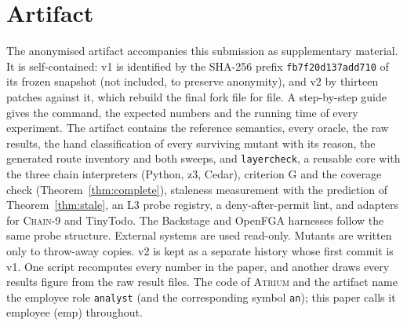 \documentclass[sigconf,review,anonymous]{acmart}
\newcommand{\sysname}{\textsc{Atrium}\xspace}
\newcommand{\sysname}{\textsc{OpenZTAC}\xspace}
\newcommand{\chain}{\textsc{Chain-9}\xspace}
\newcommand{\emp}{\mathrm{emp}}
\begin{document}
\section{Artifact}
\label{app:artifact}
The anonymised artifact accompanies this submission as supplementary material. It is self-contained: v1 is identified by the SHA-256 prefix \texttt{fb7f20d137add710} of its frozen
snapshot (not included, to preserve anonymity), and v2 by thirteen patches against it, which rebuild the final fork
file for file. A step-by-step guide gives the command, the expected numbers and the running time of every
experiment. The artifact contains the reference semantics, every oracle, the raw results, the hand classification
of every surviving mutant with its reason, the generated route inventory and both sweeps, and \texttt{layercheck}, a reusable
core with the three chain interpreters (Python, z3, Cedar), criterion G and the coverage check
(Theorem~\ref{thm:complete}), staleness measurement with the prediction of Theorem~\ref{thm:stale}, an L3 probe
registry, a deny-after-permit lint, and adapters for \chain and TinyTodo. The Backstage and OpenFGA harnesses follow
the same probe structure. External systems are used read-only. Mutants are written only to throw-away copies. v2
is kept as a separate history whose first commit is v1. One script recomputes every number in the paper, and
another draws every results figure from the raw result files. The code of \sysname and the artifact name the
employee role \texttt{analyst} (and the corresponding symbol \texttt{an}); this paper calls it employee
($\emp$) throughout.
\end{document}
